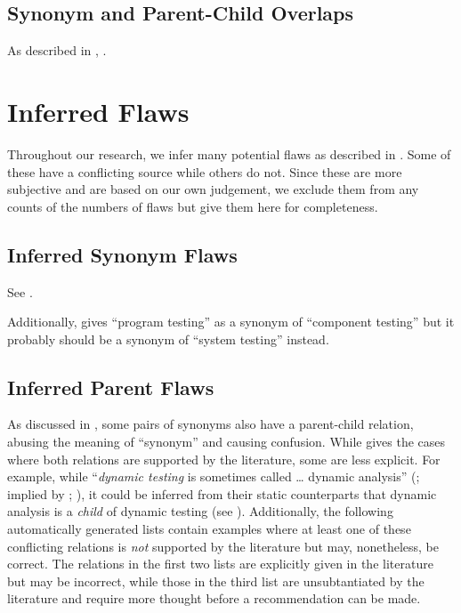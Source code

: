 \subsection{Synonym and Parent-Child Overlaps}\label{parSyns-full}
As described in , \parSynIntro*{}.
\begin{landscape}
    
\end{landscape}

\section{Inferred Flaws}\label{infer-flaws}
Throughout our research, we infer many potential flaws as described in
. Some of these have a conflicting source while others do not.
Since these are more subjective and are based on our own judgement, we
exclude them from any counts of the numbers of flaws but give them here for
completeness.

\subsection{Inferred Synonym Flaws}\label{infMultiSyns}
See .

\begin{enumerate}
    
\end{enumerate}

Additionally, \citet[p.~46]{Kam2008} gives ``program testing'' as a synonym
of ``component testing'' but it probably should be a synonym of ``system
testing'' instead.

\subsection{Inferred Parent Flaws}\label{infParSyns}
As discussed in , some pairs of synonyms also have a
parent-child relation, abusing the meaning of ``synonym'' and causing
confusion. While  gives the cases where both relations
are supported by the literature, some are less explicit. For example, while
``\emph{dynamic testing} is sometimes called \dots{} dynamic analysis''
(\citealp[p.~438]{PetersAndPedrycz2000}; implied by
\citealp[p.~149]{IEEE2017}; \citealpISTQB{}), it could be inferred from
their static counterparts that dynamic analysis is a \emph{child} of dynamic
testing (see \citealp[pp.~9, 17, 25, 28]{IEEE2022}). Additionally, the
following automatically generated lists contain examples where at least
one of these conflicting relations is \emph{not} supported by the
literature but may, nonetheless, be correct. The relations in the first two
lists are explicitly given in the literature but may be incorrect, while
those in the third list are unsubtantiated by the literature and require
more thought before a recommendation can be made.


